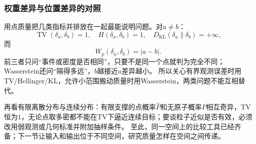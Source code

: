 \subsubsection{权重差异与位置差异的对照}

用点质量把几类指标并排放在一起最能说明问题。对$a\neq b$：
\[
 \operatorname{TV}(\delta_a,\delta_b)=1,\quad
 H(\delta_a,\delta_b)=1,\quad
 D_{\mathrm{KL}}(\delta_a\|\delta_b)=+\infty,
\]
而
\[
 W_p(\delta_a,\delta_b)=|a-b|.
\]
前三者只问“事件或密度是否相同”，只要不是同一个点就判为完全不同；Wasserstein还问“隔得多远”，$b$越接近$a$差异越小。
所以关心有界观测误差时用TV/Hellinger/KL，允许小范围搬动质量时用Wasserstein，两类问题不能互相替代。

再看有限离散分布与连续分布：有限支撑的点概率$\widehat P$和无原子概率$P$相互奇异，TV恒为$1$，无论点取多密都不能在TV下逼近连续目标；要谈粒子近似是否有效，必须改用弱观测或几何标准并附加抽样条件。
至此，同一空间上的比较工具已经齐备；下一节让输入和输出位于不同空间，研究质量怎样在空间之间传递。
